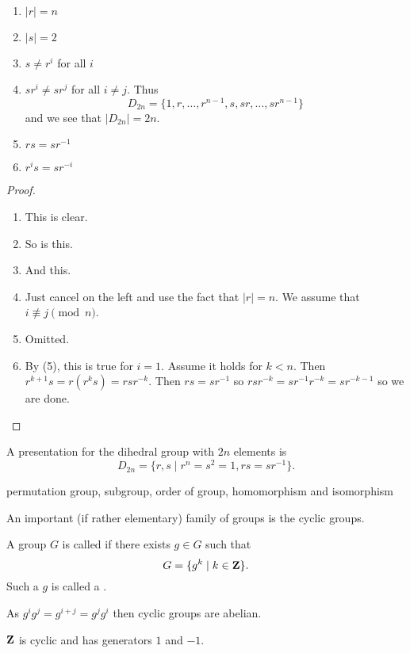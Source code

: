 \begin{proposition} \
\begin{enumerate}[label=(\arabic*)]
\item $|r|=n$
\item $|s|=2$
\item $s\neq r^i$ for all $i$
\item $sr^i\neq sr^j$ for all $i\neq j$. Thus
\[D_{2n}=\{1,r,\dots,r^{n-1},s,sr,\dots,sr^{n-1}\}\]
and we see that $|D_{2n}|=2n$.
\item $rs=sr^{-1}$
\item $r^is=sr^{-i}$
\end{enumerate}
\end{proposition}

\begin{proof} \
\begin{enumerate}[label=(\arabic*)]
\item This is clear.
\item So is this.
\item And this.
\item Just cancel on the left and use the fact that $|r|=n$. We assume that $i\not\equiv j\pmod n$.
\item Omitted.
\item By (5), this is true for $i=1$. Assume it holds for $k<n$. Then $r^{k+1}s=r(r^ks)=rsr^{-k}$. Then $rs=sr^{-1}$ so $rsr^{-k}=sr^{-1}r^{-k}=sr^{-k-1}$ so we are done.
\end{enumerate}
\end{proof}

A presentation for the dihedral group with $2n$ elements is
\[D_{2n}=\{r,s\mid r^n=s^2=1,rs=sr^{-1}\}.\]


permutation group, subgroup, order of group, homomorphism and isomorphism

An important (if rather elementary) family of groups is the cyclic groups.

\begin{definition}
A group $G$ is called  if there exists $g\in G$ such that
\[ G=\{g^k\mid k\in\mathbf Z\}. \]
Such a $g$ is called a \vocab{generator}.
\end{definition}

As $g^ig^j=g^{i+j}=g^jg^i$ then cyclic groups are abelian.

\begin{example}
$\mathbf Z$ is cyclic and has generators $1$ and $-1$.
\end{example}

